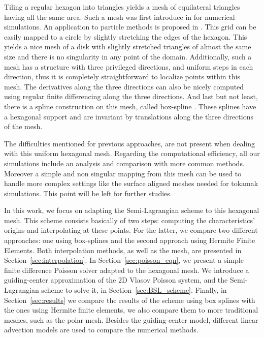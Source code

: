 \documentclass[proc]{edpsmath}
\begin{document}
Tiling a regular hexagon into triangles yields a mesh of equilateral triangles having all the same area.
Such a mesh was first introduce in \cite{Sadourny1968} for numerical simulations. An application to particle methods is proposed in \cite{chatelain2008isotropic}.
This grid can be easily mapped to a circle by slightly stretching the edges of the hexagon. This yields a nice mesh of a disk with slightly stretched triangles of almost the same size and there is no singularity in any point of the domain. 
Additionally, such a mesh has a structure with three privileged directions, and uniform steps in each direction, thus it is completely straightforward to localize points within this mesh. The derivatives along the three directions can also be nicely computed using regular finite differencing along the three directions. 
And last but not least, there is a spline construction on this mesh, called box-spline \cite{Condat2008}. These splines have a hexagonal support and are invariant by translations along the three directions of the mesh. 

The difficulties mentioned for previous approaches, are not present when dealing with this uniform hexagonal mesh. Regarding the computational efficiency, all our simulations include an analysis and comparison with more common methods. 
Moreover a simple and non singular mapping from this mesh can be used  to handle more complex settings
like the surface aligned meshes needed for tokamak simulations. This point will be left for further studies.

In this work, we focus on adapting the Semi-Lagrangian scheme to this hexagonal mesh. This scheme consists basically of two steps: computing the characteristics' origins and interpolating at these points. For the latter, we compare two different approaches: one using box-splines and the second approach using Hermite Finite Elements. Both interpolation methods, as well as the mesh, are presented in Section~\ref{sec:interpolation}. In Section~\ref{sec:poisson_eqn}, we present a simple finite difference Poisson solver adapted to the hexagonal mesh. We introduce a guiding-center approximation of the 2D Vlasov Poisson system\cite{Golse1998865}, and the Semi-Lagrangian scheme to solve it, in Section~\ref{sec:BSL_scheme}. Finally, in Section~\ref{sec:results} we compare the results of the scheme using box splines with the ones using Hermite finite elements, we also compare them to more traditional meshes, such as the polar mesh. Besides the guiding-center model, different linear advection models are used to compare the numerical methods.
\end{document}
